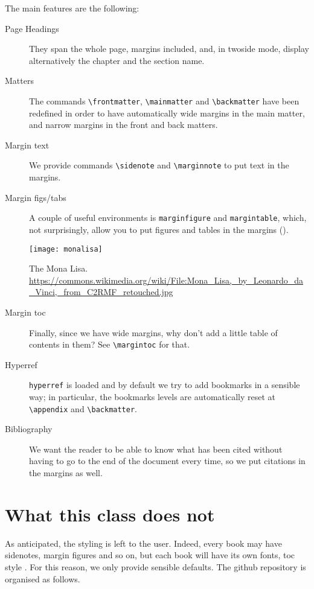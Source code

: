 The main features are the following:

\begin{description}
	\item[Page Headings] They span the whole page, margins included, 
		and, in twoside mode, display alternatively the chapter and the 
		section name.
	\item[Matters] The commands \verb|\frontmatter|, \verb|\mainmatter| 
		and \verb|\backmatter| have been redefined in order to have 
		automatically wide margins in the main matter, and narrow 
		margins in the front and back matters.
	\item[Margin text] We provide commands \verb|\sidenote| and 
		\verb|\marginnote| to put text in the 
		margins.
	\item[Margin figs/tabs] A couple of useful environments is 
		\verb|marginfigure| and \verb|margintable|, which, not 
		surprisingly, allow you to put figures and tables in the margins 
		(\cfr {}).
		\begin{marginfigure}
			\texttt{[image: monalisa]}
			\caption[The Mona Lisa]{The Mona Lisa.\\
				\url{https://commons.wikimedia.org/wiki/File:Mona_Lisa,_by_Leonardo_da_Vinci,_from_C2RMF_retouched.jpg}}
		\end{marginfigure}
	\item[Margin toc] Finally, since we have wide margins, why don't add 
		a little table of contents in them? See \verb|\margintoc| for 
		that.
	\item[Hyperref] \verb|hyperref| is loaded and by default we try to 
		add bookmarks in a sensible way; in particular, the bookmarks 
		levels are automatically reset at \verb|\appendix| and 
		\verb|\backmatter|.
	\item[Bibliography] We want the reader to be able to know what has 
		been cited without having to go to the end of the document every 
		time, so we put citations in the margins as well.
\end{description}

\section{What this class does not}

As anticipated, the styling is left to the user. Indeed, every book may 
have sidenotes, margin figures and so on, but each book will have its 
own fonts, toc style \etcetera. For this reason, we only provide 
sensible defaults. The github repository is organised as follows.

